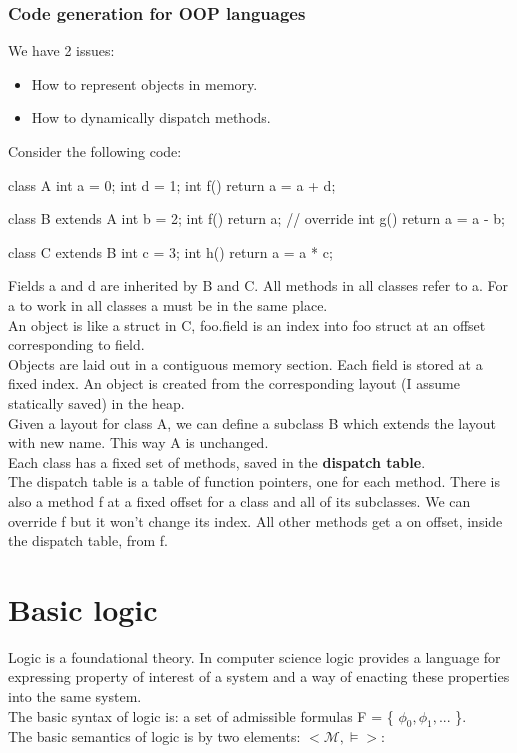 \documentclass[12pt]{article}
\begin{document}
\subsubsection{Code generation for OOP languages}
We have 2 issues: 
\begin{itemize}
    \item How to represent objects in memory.
    \item How to dynamically dispatch methods.
\end{itemize}
Consider the following code: 
\begin{mycode}
    class A { 
        int a = 0;
        int d = 1;
        int f() { return a = a + d; }
    }

    class B extends A {
        int b = 2;
        int f() { return a; } // override
        int g() { return a = a - b; }
    }

    class C extends B {
        int c = 3;
        int h() { return a = a * c; }
    }
\end{mycode}
Fields a and d are inherited by B and C. All methods in all classes refer to a. For a to work in all classes a must be in the same place. 
\\ An object is like a struct in C, foo.field is an index into foo struct at an offset corresponding to field. 
\\ Objects are laid out in a contiguous memory section. Each field is stored at a fixed index. An object is created from the corresponding layout (I assume statically saved) in the heap.
\\ Given a layout for class A, we can define a subclass B which extends the layout with new name.
This way A is unchanged.
\\ Each class has a fixed set of methods, saved in the \textbf{dispatch table}. 
\\ The dispatch table is a table of function pointers, one for each method. There is also a method f at a fixed offset for a class and all of its subclasses. 
We can override f but it won't change its index.
All other methods get a on offset, inside the dispatch table, from f.

\section{Basic logic}
Logic is a foundational theory.
In computer science logic provides a language for expressing property of interest of a system and a way of enacting these properties into the same system.
\\ The basic syntax of logic is: a set of admissible formulas F = \{ $\phi_0, \phi_1,...$ \}.
\\ The basic semantics of logic is by two elements: $<\mathcal{M}, \models>$: 
\end{document}
